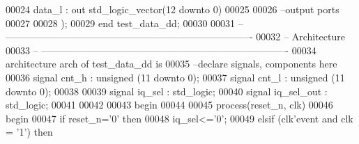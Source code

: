 \begin{DoxyCode}
00024             \textcolor{vhdlchar}{data_l}        \textcolor{vhdlchar}{:} \textcolor{keywordflow}{out} \textcolor{comment}{std\_logic\_vector}\textcolor{vhdlchar}{(}\textcolor{vhdllogic}{}\textcolor{vhdllogic}{12} \textcolor{keywordflow}{downto} \textcolor{vhdllogic}{}\textcolor{vhdllogic}{0}\textcolor{vhdlchar}{)}
00025 
00026 \textcolor{keyword}{        --output ports }
00027         
00028         \textcolor{vhdlchar}{)};
00029 \textcolor{keywordflow}{end} \textcolor{vhdlchar}{test\_data\_dd};
00030 
00031 \textcolor{keyword}{-- ----------------------------------------------------------------------------}
00032 \textcolor{keyword}{-- Architecture}
00033 \textcolor{keyword}{-- ----------------------------------------------------------------------------}
00034 \textcolor{keywordflow}{architecture} arch \textcolor{keywordflow}{of} test_data_dd is
00035 \textcolor{keyword}{--declare signals,  components here}
00036 \textcolor{keywordflow}{signal} \textcolor{vhdlchar}{cnt_h}        \textcolor{vhdlchar}{:} \textcolor{comment}{unsigned} \textcolor{vhdlchar}{(}\textcolor{vhdllogic}{}\textcolor{vhdllogic}{11} \textcolor{keywordflow}{downto} \textcolor{vhdllogic}{}\textcolor{vhdllogic}{0}\textcolor{vhdlchar}{)};
00037 \textcolor{keywordflow}{signal} \textcolor{vhdlchar}{cnt_l}        \textcolor{vhdlchar}{:} \textcolor{comment}{unsigned} \textcolor{vhdlchar}{(}\textcolor{vhdllogic}{}\textcolor{vhdllogic}{11} \textcolor{keywordflow}{downto} \textcolor{vhdllogic}{}\textcolor{vhdllogic}{0}\textcolor{vhdlchar}{)};
00038 
00039 \textcolor{keywordflow}{signal} \textcolor{vhdlchar}{iq_sel}       \textcolor{vhdlchar}{:} \textcolor{comment}{std\_logic};
00040 \textcolor{keywordflow}{signal} \textcolor{vhdlchar}{iq_sel_out}   \textcolor{vhdlchar}{:} \textcolor{comment}{std\_logic}; 
00041 
00042   
00043 \textcolor{vhdlkeyword}{begin}
00044 
00045   \textcolor{keywordflow}{process}(reset_n, clk)
00046 \textcolor{vhdlkeyword}{    begin}
00047       \textcolor{keywordflow}{if} \textcolor{vhdlchar}{reset_n}\textcolor{vhdlchar}{=}\textcolor{vhdlchar}{'}\textcolor{vhdllogic}{}\textcolor{vhdllogic}{0}\textcolor{vhdlchar}{'} \textcolor{keywordflow}{then}
00048           \textcolor{vhdlchar}{iq_sel}\textcolor{vhdlchar}{<=}\textcolor{vhdlchar}{'}\textcolor{vhdllogic}{}\textcolor{vhdllogic}{0}\textcolor{vhdlchar}{'}; 
00049         \textcolor{keywordflow}{elsif} \textcolor{vhdlchar}{(}\textcolor{vhdlchar}{clk}\textcolor{vhdlchar}{'}\textcolor{vhdlkeyword}{event} \textcolor{keywordflow}{and} \textcolor{vhdlchar}{clk} \textcolor{vhdlchar}{=} \textcolor{vhdlchar}{'}\textcolor{vhdllogic}{}\textcolor{vhdllogic}{1}\textcolor{vhdlchar}{'}\textcolor{vhdlchar}{)} \textcolor{keywordflow}{then}

\end{DoxyCode}
